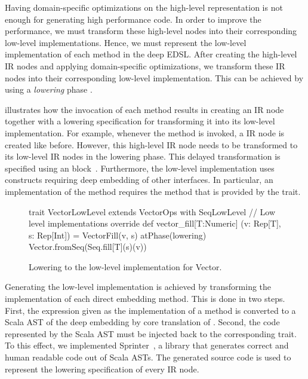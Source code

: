 Having domain-specific optimizations on the high-level representation is not
enough for generating high performance code. In order to improve the
performance, we must transform these high-level nodes into their corresponding
low-level implementations. Hence, we must represent the low-level
implementation of each method in the deep EDSL. After creating the high-level
IR nodes and applying domain-specific optimizations, we transform these IR
nodes into their corresponding low-level implementation. This can be achieved by
using a \emph{lowering} phase \cite{rompf_optimizing_2013}.

 illustrates how the invocation of each method
results in creating an IR node together with a lowering specification for
transforming it into its low-level implementation. For example, whenever the
method  is invoked, a  IR node is created like
before. However, this high-level IR node needs to be transformed to its low-level
IR nodes in the lowering phase. This delayed transformation is specified
using an  block~\cite{rompf_optimizing_2013}.
Furthermore, the low-level implementation uses constructs requiring deep
embedding of other interfaces. In particular, an implementation of the
 method requires the  method that is provided by
the  trait.
\begin{figure}[ht]
\begin{listingtiny}
trait VectorLowLevel extends VectorOps
  with SeqLowLevel {
  // Low level implementations
  override def vector_fill[T:Numeric]
    (v: Rep[T], s: Rep[Int]) =
    VectorFill(v, s) atPhase(lowering) {
      Vector.fromSeq(Seq.fill[T](s)(v))
    }
}
\end{listingtiny}
\caption{\label{lst:vector_deep_low} Lowering to the low-level implementation for Vector.}
\end{figure}

Generating the low-level implementation is achieved by transforming the
implementation of each direct embedding method. This is done in two steps.
First, the expression given as the implementation of a method is converted to
a Scala AST of the deep embedding by core translation of \yy. Second, the
code represented by the Scala AST must be injected back to the corresponding
trait. To this effect, we implemented Sprinter~\cite{sprinter}, a library that generates
correct and human readable code out of Scala ASTs. The generated source code
is used to represent the lowering specification of every IR node.


